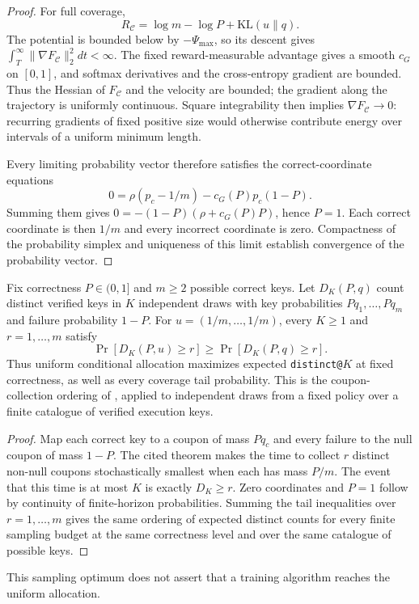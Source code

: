 \begin{proof}
\enforcehalffinalproseline
For full coverage,
\begin{equation}
 R_{\mathcal C}=\log m-\log P+\mathrm{KL}(u\|q).
 \label{eq:replay-mass-uniformity-decomposition}
\end{equation}
The potential is bounded below by $-\Psi_{\max}$, so its descent gives
$\int_T^\infty\|\nabla F_{\mathcal C}\|_2^2dt<\infty$. The fixed reward-measurable
advantage gives a smooth $c_G$ on $[0,1]$, and softmax derivatives and the cross-entropy
gradient are bounded. Thus the Hessian of $F_{\mathcal C}$ and the velocity
are bounded; the gradient along the trajectory is uniformly continuous.
Square integrability then implies $\nabla F_{\mathcal C}\to0$: recurring
gradients of fixed positive size would otherwise contribute energy over
intervals of a uniform minimum length.

Every limiting probability vector therefore satisfies the correct-coordinate
equations
\[
 0=\rho(p_c-1/m)-c_G(P)p_c(1-P).
\]
Summing them gives $0=-(1-P)(\rho+c_G(P)P)$, hence $P=1$. Each correct
coordinate is then $1/m$ and every incorrect coordinate is zero. Compactness
of the probability simplex and uniqueness of this limit establish convergence
of the probability vector.
\end{proof}

\begin{corollary}
\enforcehalffinalproseline
\label{cor:coupon-uniform-coverage}
Fix correctness $P\in(0,1]$ and $m\ge2$ possible correct keys.
Let $D_K(P,q)$ count distinct verified keys in $K$ independent draws with
key probabilities $Pq_1,\ldots,Pq_m$ and failure probability $1-P$.
For $u=(1/m,\ldots,1/m)$, every $K\ge1$ and $r=1,\ldots,m$ satisfy
\begin{equation}
 \Pr[D_K(P,u)\ge r]\ge\Pr[D_K(P,q)\ge r].
 \label{eq:coupon-uniform-coverage}
\end{equation}
Thus uniform conditional allocation maximizes expected \texttt{distinct@}$K$
at fixed correctness, as well as every coverage tail probability. This is
the coupon-collection ordering of
\citet[Theorem~3, v1]{anceaume2015coupon}, applied to independent draws
from a fixed policy over a finite catalogue of verified execution keys.
\end{corollary}
\begin{proof}
\enforcehalffinalproseline
Map each correct key to a coupon of mass $Pq_c$ and every failure to the
null coupon of mass $1-P$. The cited theorem makes the time to collect $r$
distinct non-null coupons stochastically smallest when each has mass $P/m$.
The event that this time is at most $K$ is exactly $D_K\ge r$.
Zero coordinates and $P=1$ follow by continuity of finite-horizon
probabilities. Summing the tail inequalities over $r=1,\ldots,m$ gives the
same ordering of expected distinct counts for every finite sampling budget
at the same correctness level and over the same catalogue of possible keys.
\end{proof}
This sampling optimum does not assert that a training algorithm reaches the
uniform allocation.

